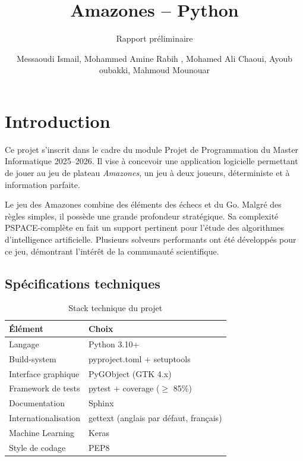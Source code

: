 \documentclass[a4paper]{article}
\title{Amazones -- Python}
\subtitle{Rapport préliminaire}
\author{Messaoudi Ismail, Mohammed Amine Rabih , Mohamed Ali Chaoui, Ayoub oubakki, Mahmoud Mounouar}
\begin{document}

\maketitle
\thispagestyle{empty}


\section*{Introduction}

Ce projet s'inscrit dans le cadre du module Projet de Programmation du Master Informatique 2025--2026. Il vise à concevoir une application logicielle permettant de jouer au jeu de plateau \textit{Amazones}, un jeu à deux joueurs, déterministe et à information parfaite.

Le jeu des Amazones combine des éléments des échecs et du Go. Malgré des règles simples, il possède une grande profondeur stratégique. Sa complexité PSPACE-complète \cite{hearn2005} en fait un support pertinent pour l'étude des algorithmes d'intelligence artificielle. Plusieurs solveurs performants \cite{song2015} ont été développés pour ce jeu, démontrant l'intérêt de la communauté scientifique.



\subsection*{Spécifications techniques}

\begin{table}[H]
\centering
\begin{tabular}{ll}
\toprule
\textbf{Élément} & \textbf{Choix} \\
\midrule
Langage & Python 3.10+ \\
Build-system & pyproject.toml + setuptools \\
Interface graphique & PyGObject (GTK 4.x) \\
Framework de tests & pytest + coverage ($\geq$ 85\%) \\
Documentation & Sphinx \\
Internationalisation & gettext (anglais par défaut, français) \\
Machine Learning & Keras \\
Style de codage & PEP8 \\
\bottomrule
\end{tabular}
\caption{Stack technique du projet}
\end{table}
\end{document}
